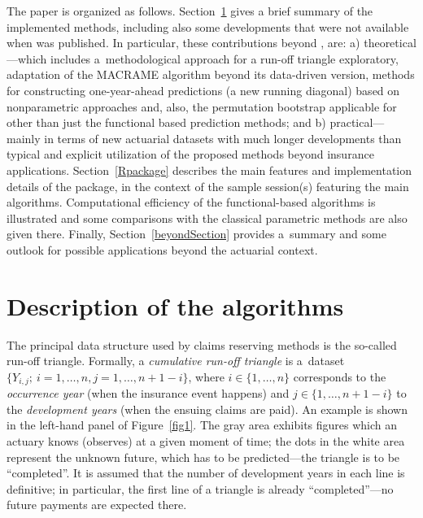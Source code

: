 The paper is organized as follows. Section~\ref{theory} gives a brief summary of the implemented methods, including also some developments that were not available when \citet{MMP2022} was published. In particular, these contributions beyond \citet{MMP2022}, are: a) theoretical---which includes a~methodological approach for a run-off triangle exploratory, adaptation of the MACRAME algorithm beyond its data-driven version, methods for constructing one-year-ahead predictions (a new running diagonal) based on nonparametric approaches and, also, the permutation bootstrap applicable for other than just the functional based prediction methods; and b) practical---mainly in terms of new actuarial datasets with much longer developments than typical and explicit utilization of the proposed methods beyond insurance applications. Section~\ref{Rpackage} describes the main features and implementation details of the  package, in the context of the sample session(s) featuring the main algorithms. Computational efficiency of the functional-based algorithms is illustrated and some comparisons with the classical parametric methods are also given there.  Finally, Section~\ref{beyondSection} provides a~summary and some outlook for possible applications beyond the actuarial context.

\section{Description of the algorithms}\label{theory}
The principal data structure used by claims reserving methods is the so-called run-off triangle. Formally, a \emph{cumulative run-off triangle} is a~dataset $\{Y_{i,j};~i = 1, \dots, n, j = 1, \dots, n + 1 - i\}$, where  $i \in \{1, \dots, n\}$ corresponds to the \emph{occurrence year} (when the insurance event happens) and $j \in \{1, \dots, n + 1 - i\}$ to the \emph{development years} (when the ensuing claims are paid). An example is shown in the left-hand panel of Figure~\ref{fig1}. The gray area exhibits figures which an actuary knows (observes) at a given moment of time; the dots in the white area represent the unknown future, which has to be predicted---the triangle is to be ``completed''. It is assumed that the number of development years in each line is definitive; in particular, the first line of a triangle is already ``completed''---no future payments are expected there. 


